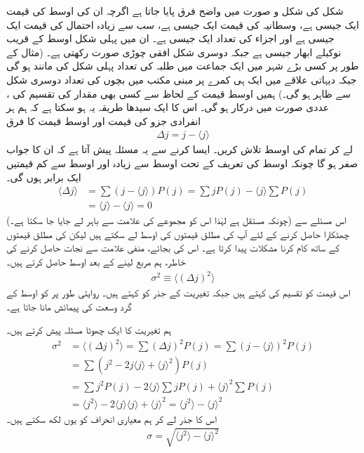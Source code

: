 شکل  کی شکل و صورت میں واضح فرق پایا جاتا ہے اگرچہ ان کی اوسط کی قیمت ایک جیسی ہے، وسطانیہ کی قیمت ایک جیسی ہے، سب سے زیادہ احتمال کی قیمت ایک جیسی ہے اور اجزاء کی تعداد ایک جیسی ہے۔ ان میں پہلی شکل اوسط کے قریب نوکیلے ابھار جیسی ہے جبکہ دوسری شکل افقی چوڑی صورت رکھتی ہے۔ (مثال کے طور پر کسی بڑے شہر میں ایک جماعت میں طلبہ کی تعداد پہلی شکل کی مانند ہو گی جبکہ دیہاتی علاقے میں ایک ہی کمرے پر مبنی مکتب میں بچوں کی تعداد دوسری شکل سے ظاہر ہو گی۔) ہمیں اوسط قیمت کے لحاظ سے کسی بھی مقدار کی تقسیم کی ، عددی صورت میں درکار ہو گی۔ اس کا ایک سیدھا طریقہ یہ ہو سکتا ہے کہ ہم ہر انفرادی جزو کی قیمت اور اوسط قیمت کا فرق
\begin{align}
\Delta j = j-\langle j \rangle 
\end{align}
لے کر تمام  کی اوسط تلاش کریں۔ ایسا کرنے سے یہ مسئلہ پیش آتا ہے کہ ان کا جواب صفر ہو گا چونکہ اوسط کی تعریف کے تحت اوسط سے زیادہ اور اوسط سے کم قیمتیں ایک برابر ہوں گی۔ 
\begin{align*}
\langle \Delta j \rangle &= \sum \left( j - \langle j \rangle \right) P(j) = \sum jP(j) - \langle j \rangle \sum P(j) \\
 &= \langle j \rangle - \langle j \rangle = 0
\end{align*}
(چونکہ  مستقل ہے لہٰذا اس کو مجموعے کی علامت سے باہر لے جایا جا سکتا ہے۔) اس مسئلے سے چھٹکارا حاصل کرنے کے لئے آپ  کی مطلق قیمتوں کی اوسط لے سکتے ہیں لیکن  کی مطلق قیمتوں کے ساتھ کام کرنا مشکلات پیدا کرتا ہے۔ اس کی بجائے، منفی علامت سے نجات حاصل کرنے کی خاطر، ہم مربع لینے کے بعد اوسط حاصل کرتے ہیں۔
\begin{align} \label{مساوات_تفاعل_موج_تعریف_معیاری_احتمال_الف}
 \sigma^{2} \equiv \langle \left( \Delta j \right)^{2} \rangle 
\end{align}
اس قیمت کو تقسیم کی  کہتے ہیں جبکہ تغیریت کے جذر  کو  کہتے ہیں۔ روایتی طور پر  کو اوسط  کے گرد وسعت کی پیمائش مانا جاتا ہے۔

 ہم تغیریت کا ایک چھوٹا مسئلہ پیش کرتے ہیں۔ 
\begin{align*}
\sigma^{2} &= \langle ( \Delta j )^{2} \rangle = \sum ( \Delta j )^{2} P(j) = \sum (j- \langle j \rangle )^{2} P(j) \\
&= \sum (j^{2} -2j \langle j \rangle + \langle j \rangle ^{2} ) P(j) \\ 
&= \sum j^{2} P(j) -2 \langle j \rangle \sum jP(j) + \langle j \rangle ^{2} \sum P(j) \\ 
&= \langle j^{2}\rangle -2\langle j \rangle \langle j \rangle + \langle j \rangle ^{2} = \langle j^{2} \rangle - \langle j \rangle ^{2}
\end{align*}
اس کا جذر لے کر ہم معیاری انحراف کو یوں لکھ سکتے ہیں۔ 
\begin{align}\label{مساوات_تفاعل_موج_تعریف_معیاری_احتمال_ب}
 \sigma = \sqrt{\langle j^{2} \rangle - \langle j \rangle ^{2}} 
\end{align}


